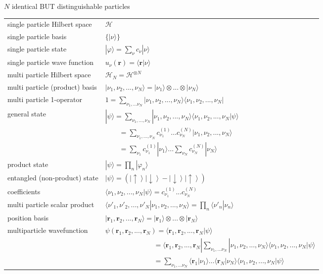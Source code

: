 \documentclass[../main.tex]{subfiles}
\begin{document}
\begin{enumerate}[(a)]
$N$ identical BUT distinguishable particles 
\begin{table}
\begin{tabular}{ll}
single particle Hilbert space & $\mathcal{H}$\\
single particle basis & $\{|\nu\rangle\}$\\
single particle state & $|\varphi\rangle=\sum_\nu c_\nu|\nu\rangle$\\
single particle wave function & $u_\nu(\mathbf{r})=\langle\mathbf{r}|\nu\rangle$\\
multi particle Hilbert space & $\mathcal{H}_N=\mathcal{H}^{\otimes N}$\\
multi particle (product) basis & $|\nu_1,\nu_2,...,\nu_N\rangle=|\nu_1\rangle\otimes...\otimes|\nu_N\rangle$\\
multi particle 1-operator & $1=\sum_{\nu_1,...\nu_N}|\nu_1,\nu_2,...,\nu_N\rangle\langle\nu_1,\nu_2,...,\nu_N|$\\
general state&$|\psi\rangle=\sum_{\nu_1,...,\nu_N}|\nu_1,\nu_2,...,\nu_N\rangle\langle\nu_1,\nu_2,...,\nu_N|\psi\rangle$\\
&$\qquad=\sum_{\nu_1,...,\nu_N}c_{\nu_1}^{(1)}...c_{\nu_N}^{(N)}|\nu_1,\nu_2,...,\nu_N\rangle$\\
&$\qquad=\sum_{\nu_1}c_{\nu_1}^{(1)}|\nu_1\rangle...\sum_{\nu_N}c_{\nu_N}^{(N)}|\nu_N\rangle$\\
product state &$|\psi\rangle=\prod_{n}|\varphi_n\rangle$\\
entangled (non-product) state &$|\psi\rangle=(\left|\uparrow\right\rangle\left|\downarrow\right\rangle-\left|\downarrow\right\rangle\left|\uparrow\right\rangle)$\\
coefficients & $\langle\nu_1,\nu_2,...,\nu_N|\psi\rangle=c_{\nu_1}^{(1)}...c_{\nu_N}^{(N)}$\\
multi particle scalar product & $\langle\nu'_1,\nu'_2,...,\nu'_N|\nu_1,\nu_2,...,\nu_N\rangle=\prod_n\langle\nu'_n|\nu_n\rangle$\\
position basis & $|\mathbf{r}_1,\mathbf{r}_2,...,\mathbf{r}_N\rangle=|\mathbf{r}_1\rangle\otimes...\otimes|\mathbf{r}_N\rangle$\\
multiparticle wavefunction & $\psi(\mathbf{r}_1,\mathbf{r}_2,...,\mathbf{r}_N)=\langle\mathbf{r}_1,\mathbf{r}_2,...,\mathbf{r}_N|\psi\rangle$\\
& $\qquad\qquad\qquad\quad=\langle\mathbf{r}_1,\mathbf{r}_2,...,\mathbf{r}_N|\sum_{\nu_1,...\nu_N}|\nu_1,\nu_2,...,\nu_N\rangle\langle\nu_1,\nu_2,...,\nu_N|\psi\rangle$\\
& $\qquad\qquad\qquad\quad=\sum_{\nu_1,...\nu_N}\langle\mathbf{r}_1|\nu_1\rangle...\langle\mathbf{r}_N|\nu_N\rangle\langle\nu_1,\nu_2,...,\nu_N|\psi\rangle$\\

\end{tabular}
\end{table}
\end{enumerate}
\end{document}
